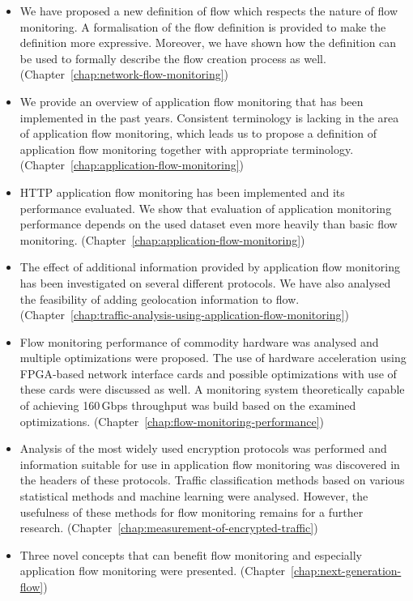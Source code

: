 \begin{itemize}
    \item We have proposed a new definition of flow which respects the nature of flow monitoring. A formalisation of the flow definition is provided to make the definition more expressive. Moreover, we have shown how the definition can be used to formally describe the flow creation process as well. (Chapter~\ref{chap:network-flow-monitoring})
    \item We provide an overview of application flow monitoring that has been implemented in the past years. Consistent terminology is lacking in the area of application flow monitoring, which leads us to propose a definition of application flow monitoring together with appropriate terminology. (Chapter~\ref{chap:application-flow-monitoring})
    \item HTTP application flow monitoring has been implemented and its performance evaluated. We show that evaluation of application monitoring performance depends on the used dataset even more heavily than basic flow monitoring. (Chapter~\ref{chap:application-flow-monitoring})
    \item The effect of additional information provided by application flow monitoring has been investigated on several different protocols. We have also analysed the feasibility of adding geolocation information to flow. (Chapter~\ref{chap:traffic-analysis-using-application-flow-monitoring})
    \item Flow monitoring performance of commodity hardware was analysed and multiple optimizations were proposed. The use of hardware acceleration using FPGA-based network interface cards and possible optimizations with use of these cards were discussed as well. A monitoring system theoretically capable of achieving 160\,Gbps throughput was build based on the examined optimizations. (Chapter~\ref{chap:flow-monitoring-performance})
    \item Analysis of the most widely used encryption protocols was performed and information suitable for use in application flow monitoring was discovered in the headers of these protocols. Traffic classification methods based on various statistical methods and machine learning were analysed. However, the usefulness of these methods for flow monitoring remains for a further research. (Chapter~\ref{chap:measurement-of-encrypted-traffic})
    \item Three novel concepts that can benefit flow monitoring and especially application flow monitoring were presented. (Chapter~\ref{chap:next-generation-flow})
\end{itemize}

